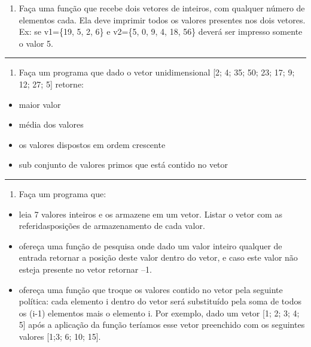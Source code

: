 \documentclass[12pt,a4paper]{article}
\providecommand{\tightlist}{%
      \setlength{\itemsep}{0pt}\setlength{\parskip}{0pt}}
\begin{document}
\begin{enumerate}
\def\labelenumi{\arabic{enumi}.}
\setcounter{enumi}{14}
\tightlist
\item
  Faça uma função que recebe dois vetores de inteiros, com qualquer
  número de elementos cada. Ela deve imprimir todos os valores presentes
  nos dois vetores. Ex: se v1=\{19, 5, 2, 6\} e v2=\{5, 0, 9, 4, 18,
  56\} deverá ser impresso somente o valor 5.
\end{enumerate}

    \begin{center}\rule{0.5\linewidth}{0.5pt}\end{center}

\begin{enumerate}
\def\labelenumi{\arabic{enumi}.}
\setcounter{enumi}{15}
\tightlist
\item
  Faça um programa que dado o vetor unidimensional {[}2; 4; 35; 50; 23;
  17; 9; 12; 27; 5{]} retorne:\\
\end{enumerate}

\begin{itemize}
\tightlist
\item
  maior valor
\item
  média dos valores
\item
  os valores dispostos em ordem crescente
\item
  sub conjunto de valores primos que está contido no vetor
\end{itemize}

    \begin{center}\rule{0.5\linewidth}{0.5pt}\end{center}

\begin{enumerate}
\def\labelenumi{\arabic{enumi}.}
\setcounter{enumi}{16}
\tightlist
\item
  Faça um programa que:
\end{enumerate}

\begin{itemize}
\tightlist
\item
  leia 7 valores inteiros e os armazene em um vetor. Listar o vetor com
  as referidasposições de armazenamento de cada valor.
\item
  ofereça uma função de pesquisa onde dado um valor inteiro qualquer de
  entrada retornar a posição deste valor dentro do vetor, e caso este
  valor não esteja presente no vetor retornar --1.
\item
  ofereça uma função que troque os valores contido no vetor pela
  seguinte política: cada elemento i dentro do vetor será substituído
  pela soma de todos os (i-1) elementos mais o elemento i. Por exemplo,
  dado um vetor {[}1; 2; 3; 4; 5{]} após a aplicação da função teríamos
  esse vetor preenchido com os seguintes valores {[}1;3; 6; 10; 15{]}.
\end{itemize}
\end{document}
